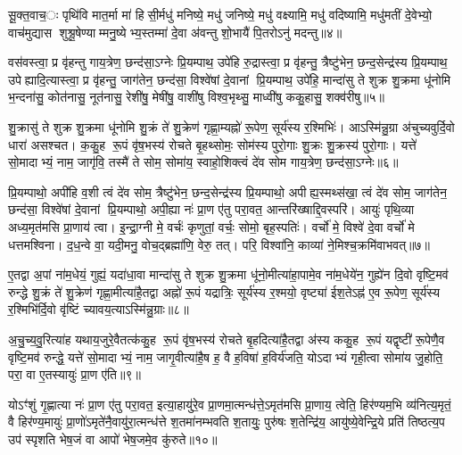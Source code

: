 सू॒क्त॒वाच॒ः पृथि॑वि मात॒र्मा मा॑ हिसी॒र्मधु॑ मनिष्ये॒ मधु॑ जनिष्ये॒ मधु॑ वक्ष्यामि॒ मधु॑ वदिष्यामि॒ मधु॑मतीं दे॒वेभ्यो॒ वाच॑मुद्यास शुश्रू॒षेण्याम्मनु॒ष्येभ्य॒स्तम्मा॑ दे॒वा अ॑वन्तु शो॒भायै॑ पि॒तरोऽनु॑ मदन्तु॥४॥

{\anuvakamend[{श॒ꣳ॒सि॒ष॒द्विश्वे॑ दे॒वा अ॒ष्टाविꣳ॑शतिश्च॥२॥}]}

वस॑वस्त्वा॒ प्र वृ॑हन्तु गाय॒त्रेण॒ छन्द॑सा॒ऽग्नेः प्रि॒यम्पाथ॒ उपे॑हि रु॒द्रास्त्वा॒ प्र वृ॑हन्तु॒ त्रैष्टु॑भेन॒ छन्द॒सेन्द्र॑स्य प्रि॒यम्पाथ॒ उपेह्यादि॒त्यास्त्वा॒ प्र वृ॑हन्तु॒ जाग॑तेन॒ छन्द॑सा॒ विश्वे॑षां दे॒वानां प्रि॒यम्पाथ॒ उपे॑हि॒ मान्दा॑सु ते शुक्र शु॒क्रमा धू॑नोमि भ॒न्दना॑सु॒ कोत॑नासु॒ नूत॑नासु॒ रेशी॑षु॒ मेषी॑षु॒ वाशी॑षु विश्व॒भृथ्सु॒ माध्वी॑षु ककु॒हासु॒ शक्व॑रीषु॥५॥

शु॒क्रासु॑ ते शुक्र शु॒क्रमा धू॑नोमि शु॒क्रं ते॑ शु॒क्रेण॑ गृह्णा॒म्यह्नो॑ रू॒पेण॒ सूर्य॑स्य र॒श्मिभिः॑। आऽस्मि॑न्नु॒ग्रा अ॑चुच्यवुर्दि॒वो धारा॑ असश्चत। क॒कु॒ह रू॒पं वृ॑ष॒भस्य॑ रोचते बृ॒हथ्सोमः॒ सोम॑स्य पुरो॒गाः शु॒क्रः शु॒क्रस्य॑ पुरो॒गाः। यत्ते॑ सो॒मादाभ्यं॒ नाम॒ जागृ॑वि॒ तस्मै॑ ते सोम॒ सोमा॑य॒ स्वाहो॒शिक्त्वं दे॑व सोम गाय॒त्रेण॒ छन्द॑सा॒ऽग्नेः॥६॥

प्रि॒यम्पाथो॒ अपी॑हि व॒शी त्वं दे॑व सोम॒ त्रैष्टु॑भेन॒ छन्द॒सेन्द्र॑स्य प्रि॒यम्पाथो॒ अपीह्य॒स्मथ्स॑खा॒ त्वं दे॑व सोम॒ जाग॑तेन॒ छन्द॑सा॒ विश्वे॑षां दे॒वानां प्रि॒यम्पाथो॒ अपी॒ह्या नः॑ प्रा॒ण ए॑तु परा॒वत॒ आन्तरि॑ख्षाद्दि॒वस्परि॑। आयुः॑ पृथि॒व्या अध्य॒मृत॑मसि प्रा॒णाय॑ त्वा। इ॒न्द्रा॒ग्नी मे॒ वर्चः॑ कृणुतां॒ वर्चः॒ सोमो॒ बृह॒स्पतिः॑। वर्चो॑ मे॒ विश्वे॑ दे॒वा वर्चो॑ मे धत्तमश्विना। द॒ध॒न्वे वा॒ यदी॒मनु॒ वोच॒द्ब्रह्मा॑णि॒ वेरु॒ तत्। परि॒ विश्वा॑नि॒ काव्या॑ ने॒मिश्च॒क्रमि॑वाभवत्॥७॥

{\anuvakamend[{शक्व॑रीष्व॒ग्नेर्बृह॒स्पतिः॒ पञ्च॑विशतिश्च॥३॥}]}

ए॒तद्वा अ॒पां ना॑म॒धेयं॒ गुह्यं॒ यदा॑धा॒वा मान्दा॑सु ते शुक्र शु॒क्रमा धू॑नो॒मीत्या॑हा॒पामे॒व ना॑म॒धेये॑न॒ गुह्ये॑न दि॒वो वृष्टि॒मव॑ रुन्द्धे शु॒क्रं ते॑ शु॒क्रेण॑ गृह्णा॒मीत्या॑है॒तद्वा अह्नो॑ रू॒पं यद्रात्रिः॒ सूर्य॑स्य र॒श्मयो॒ वृष्ट्या॑ ईश॒तेऽह्न॑ ए॒व रू॒पेण॒ सूर्य॑स्य र॒श्मिभि॑र्दि॒वो वृ॑ष्टिं च्यावय॒त्याऽस्मि॑न्नु॒ग्राः॥८॥

अ॒चु॒च्य॒वु॒रित्या॑ह यथाय॒जुरे॒वैतत्क॑कु॒ह रू॒पं वृ॑ष॒भस्य॑ रोचते बृ॒हदित्या॑है॒तद्वा अ॑स्य ककु॒ह रू॒पं यद्वृष्टी॑ रू॒पेणै॒व वृष्टि॒मव॑ रुन्द्धे॒ यत्ते॑ सो॒मादाभ्यं॒ नाम॒ जागृ॒वीत्या॑है॒ष ह॒ वै ह॒विषा॑ ह॒विर्य॑जति॒ योऽदाभ्यं गृही॒त्वा सोमा॑य जु॒होति॒ परा॒ वा ए॒तस्यायुः॑ प्रा॒ण ए॑ति॥९॥

योऽꣳ॑शुं गृ॒ह्णात्या नः॑ प्रा॒ण ए॑तु परा॒वत॒ इत्या॒हायु॑रे॒व प्रा॒णमा॒त्मन्ध॑त्ते॒ऽमृत॑मसि प्रा॒णाय॒ त्वेति॒ हिर॑ण्यम॒भि व्य॑नित्य॒मृतं॒ वै हिर॑ण्य॒मायुः॑ प्रा॒णो॑ऽमृते॑नै॒वायु॑रा॒त्मन्ध॑त्ते श॒तमा॑नम्भवति श॒तायुः॒ पुरु॑षः श॒तेन्द्रि॑य॒ आयु॑ष्ये॒वेन्द्रि॒ये प्रति॑ तिष्ठत्य॒प उप॑ स्पृशति भेष॒जं वा आपो॑ भेष॒जमे॒व कु॑रुते॥१०॥

